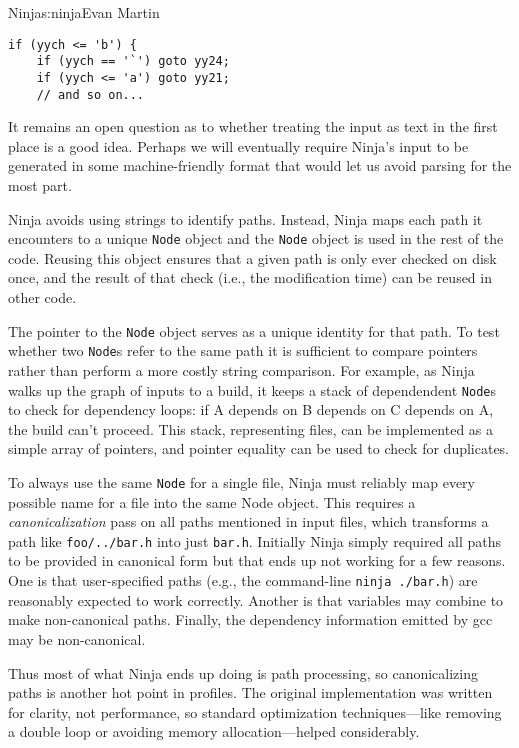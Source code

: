 \begin{aosachapter}{Ninja}{s:ninja}{Evan Martin}
\begin{verbatim}
if (yych <= 'b') {
    if (yych == '`') goto yy24;
    if (yych <= 'a') goto yy21;
    // and so on...
\end{verbatim}

It remains an open question as to whether treating the input as text in
the first place is a good idea. Perhaps we will eventually require
Ninja's input to be generated in some machine-friendly format that would
let us avoid parsing for the most part.


Ninja avoids using strings to identify paths. Instead, Ninja maps each
path it encounters to a unique \texttt{Node} object and the
\texttt{Node} object is used in the rest of the code. Reusing this
object ensures that a given path is only ever checked on disk once, and
the result of that check (i.e., the modification time) can be reused in
other code.

The pointer to the \texttt{Node} object serves as a unique identity for
that path. To test whether two \texttt{Node}s refer to the same path it
is sufficient to compare pointers rather than perform a more costly
string comparison. For example, as Ninja walks up the graph of inputs to
a build, it keeps a stack of dependendent \texttt{Node}s to check for
dependency loops: if A depends on B depends on C depends on A, the build
can't proceed. This stack, representing files, can be implemented as a
simple array of pointers, and pointer equality can be used to check for
duplicates.

To always use the same \texttt{Node} for a single file, Ninja must
reliably map every possible name for a file into the same Node object.
This requires a \emph{canonicalization} pass on all paths mentioned in
input files, which transforms a path like \texttt{foo/../bar.h} into
just \texttt{bar.h}. Initially Ninja simply required all paths to be
provided in canonical form but that ends up not working for a few
reasons. One is that user-specified paths (e.g., the command-line
\texttt{ninja ./bar.h}) are reasonably expected to work correctly.
Another is that variables may combine to make non-canonical paths.
Finally, the dependency information emitted by gcc may be non-canonical.

Thus most of what Ninja ends up doing is path processing, so
canonicalizing paths is another hot point in profiles. The original
implementation was written for clarity, not performance, so standard
optimization techniques---like removing a double loop or avoiding memory
allocation---helped considerably.


\end{aosachapter}
